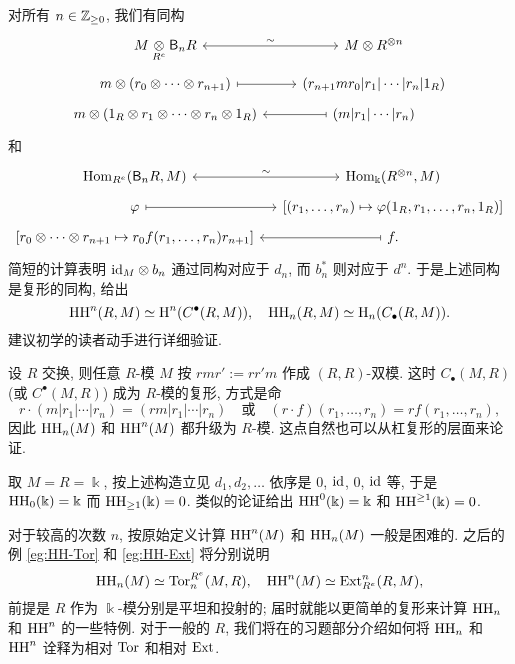 对所有 $n \in \mathbb{Z}_{\geq 0}$, 我们有同构
\[\begin{tikzcd}[row sep=tiny]
	M \dotimes{R^e} \mathsf{B}_n R \arrow[leftrightarrow, r, "\sim"] & M \otimes R^{\otimes n} \\
	m \otimes (r_0 \otimes \cdots \otimes r_{n+1}) \arrow[mapsto, r] & (r_{n+1} m r_0 | r_1 | \cdots | r_n | 1_R) \\
	m \otimes (1_R \otimes r_1 \otimes \cdots \otimes r_n \otimes 1_R )& (m | r_1 | \cdots | r_n) \arrow[mapsto, l]
\end{tikzcd}\]
和
\[\begin{tikzcd}[row sep=tiny, column sep=small]
	\Hom_{R^e}(\mathsf{B}_nR, M) \arrow[leftrightarrow, r, "\sim"] & \Hom_{\Bbbk}(R^{\otimes n}, M) \\
	\varphi \arrow[mapsto, r] & {\left[ (r_1, \ldots, r_n) \mapsto \varphi(1_R, r_1, \ldots, r_n, 1_R) \right]} \\
	{\left[ r_0 \otimes \cdots \otimes r_{n+1} \mapsto r_0 f(r_1, \ldots, r_n) r_{n+1} \right]} & f \arrow[mapsto, l] .
\end{tikzcd}\]
简短的计算表明 $\mathrm{id}_M \otimes b_n$ 通过同构对应于 $d_n$, 而 $b_n^*$ 则对应于 $d^n$. 于是上述同构是复形的同构, 给出
\[ \operatorname{HH}^n(R, M) \simeq \operatorname{H}^n(C^\bullet(R, M)), \quad \operatorname{HH}_n(R, M) \simeq \operatorname{H}_n(C_\bullet(R, M)) . \]
建议初学的读者动手进行详细验证.

\begin{remark}
	设 $R$ 交换, 则任意 $R$-模 $M$ 按 $rmr' := rr' m$ 作成 $(R,R)$-双模. 这时 $C_\bullet(M,R)$ (或 $C^\bullet(M,R)$) 成为 $R$-模的复形, 方式是命
	\[ r \cdot (m|r_1| \cdots |r_n) = (rm|r_1| \cdots | r_n) \quad \text{或} \quad (r \cdot f)(r_1, \ldots, r_n) = r f(r_1, \ldots, r_n), \]
	因此 $\operatorname{HH}_n(M)$ 和 $\operatorname{HH}^n(M)$ 都升级为 $R$-模. 这点自然也可以从杠复形的层面来论证.
\end{remark}

\begin{example}
	取 $M = R = \Bbbk$, 按上述构造立见 $d_1, d_2, \ldots$ 依序是 $0$, $\mathrm{id}$, $0$, $\mathrm{id}$ 等, 于是 $\operatorname{HH}_0(\Bbbk) = \Bbbk$ 而 $\operatorname{HH}_{\geq 1}(\Bbbk) = 0$. 类似的论证给出 $\operatorname{HH}^0(\Bbbk) = \Bbbk$ 和 $\operatorname{HH}^{\geq 1}(\Bbbk) = 0$.
\end{example}

对于较高的次数 $n$, 按原始定义计算 $\operatorname{HH}^n(M)$ 和 $\operatorname{HH}_n(M)$ 一般是困难的. 之后的例 \ref{eg:HH-Tor} 和 \ref{eg:HH-Ext} 将分别说明
\[ \operatorname{HH}_n(M) \simeq \operatorname{Tor}^{R^e}_n(M, R), \quad \operatorname{HH}^n(M) \simeq \operatorname{Ext}_{R^e}^n(R, M), \]
前提是 $R$ 作为 $\Bbbk$-模分别是平坦和投射的; 届时就能以更简单的复形来计算 $\operatorname{HH}_n$ 和 $\operatorname{HH}^n$ 的一些特例. 对于一般的 $R$, 我们将在的习题部分介绍如何将 $\operatorname{HH}_n$ 和 $\operatorname{HH}^n$ 诠释为相对 $\operatorname{Tor}$ 和相对 $\operatorname{Ext}$.

